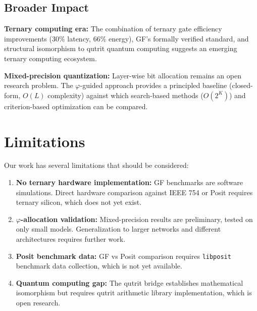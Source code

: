 \documentclass{article}
\begin{document}
\subsection{Broader Impact}

\textbf{Ternary computing era:} The combination of ternary gate efficiency improvements (30\% latency, 66\% energy), GF's formally verified standard, and structural isomorphism to qutrit quantum computing suggests an emerging ternary computing ecosystem.

\textbf{Mixed-precision quantization:} Layer-wise bit allocation remains an open research problem. The $\varphi$-guided approach provides a principled baseline (closed-form, $O(L)$ complexity) against which search-based methods ($O(2^K)$) and criterion-based optimization can be compared.


\section{Limitations}

Our work has several limitations that should be considered:

\begin{enumerate}
    \item \textbf{No ternary hardware implementation:} GF benchmarks are software simulations. Direct hardware comparison against IEEE 754 or Posit requires ternary silicon, which does not yet exist.
    \item \textbf{$\varphi$-allocation validation:} Mixed-precision results are preliminary, tested on only small models. Generalization to larger networks and different architectures requires further work.
    \item \textbf{Posit benchmark data:} GF vs Posit comparison requires \texttt{libposit} benchmark data collection, which is not yet available.
    \item \textbf{Quantum computing gap:} The qutrit bridge establishes mathematical isomorphism but requires qutrit arithmetic library implementation, which is open research.
\end{enumerate}

\end{document}
